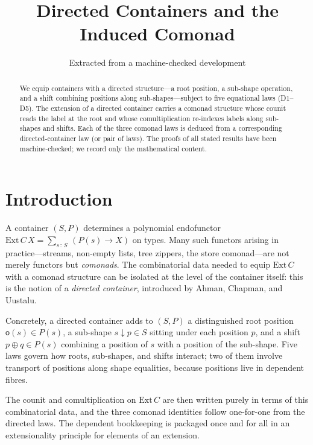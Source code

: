 \documentclass[11pt,a4paper]{article}
\title{Directed Containers and the Induced Comonad}
\author{Extracted from a machine-checked development}
\date{}
\theoremstyle{plain}
\theoremstyle{definition}
\newcommand{\Ext}{\mathrm{Ext}}
\newcommand{\rootpos}{\mathsf{o}}
\newcommand{\sub}{\mathbin{\downarrow}}
\newcommand{\shift}{\oplus}
\begin{document}
\maketitle

\begin{abstract}
We equip containers with a directed structure---a root position, a
sub-shape operation, and a shift combining positions along sub-shapes---subject
to five equational laws (D1--D5). The extension of a directed container carries
a comonad structure whose counit reads the label at the root and whose
comultiplication re-indexes labels along sub-shapes and shifts. Each of the
three comonad laws is deduced from a corresponding directed-container law (or
pair of laws). The proofs of all stated results have been machine-checked; we
record only the mathematical content.
\end{abstract}

\tableofcontents
\bigskip

\section{Introduction}

A container $(S,P)$ determines a polynomial endofunctor
$\Ext\,C\,X = \sum_{s\,:\,S}\,(P(s)\to X)$ on types. Many such functors arising
in practice---streams, non-empty lists, tree zippers, the store comonad---are
not merely functors but \emph{comonads}. The combinatorial data needed to equip
$\Ext\,C$ with a comonad structure can be isolated at the level of the container
itself: this is the notion of a \emph{directed container}, introduced by Ahman,
Chapman, and Uustalu.

Concretely, a directed container adds to $(S,P)$ a distinguished root position
$\rootpos(s)\in P(s)$, a sub-shape $s\sub p\in S$ sitting under each position
$p$, and a shift $p\shift q\in P(s)$ combining a position of $s$ with a
position of the sub-shape. Five laws govern how roots, sub-shapes, and shifts
interact; two of them involve transport of positions along shape equalities,
because positions live in dependent fibres.

The counit and comultiplication on $\Ext\,C$ are then written purely in terms
of this combinatorial data, and the three comonad identities follow one-for-one
from the directed laws. The dependent bookkeeping is packaged once and for all
in an extensionality principle for elements of an extension.
\end{document}
